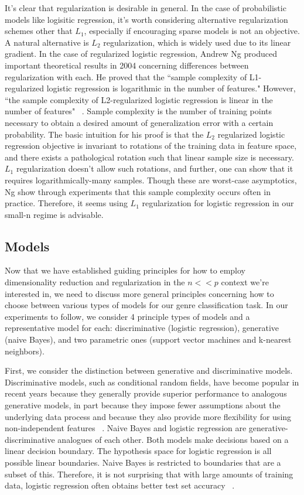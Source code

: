 \documentclass[]{article}
\begin{document}
	It's clear that regularization is desirable in general. In the case of probabilistic models like logisitic regression, it's worth considering alternative regularization schemes other that $L_1$, especially if encouraging sparse models is not an objective. A natural alternative is $L_2$ regularization, which is widely used due to its linear gradient. In the case of regularized logistic regression, Andrew Ng produced important theoretical results in 2004 concerning differences between regularization with each. He proved that the ``sample complexity of L1-regularized logistic regression is logarithmic in the number of features." However,  ``the sample complexity of L2-regularized logistic regression is linear in the number of features"  ~\cite{ng2004feature}. Sample complexity is the number of training points necessary to obtain a desired amount of generalization error with a certain probability. The basic intuition for his proof is that the $L_2$ regularized logistic regression objective is invariant to rotations of the training data in feature space, and there exists a pathological rotation such that linear sample size is necessary. $L_1$ regularization doesn't allow such rotations, and further, one can show that it requires logarithmically-many samples. Though these are worst-case asymptotics, Ng show through experiments that  this sample complexity occurs often in practice. Therefore, it seems using $L_1$ regularization for logistic regression in our small-n regime is advisable. 
\subsection{Models}
	Now that we have established guiding principles for how to employ dimensionality reduction and regularization in the $n << p$ context we're interested in, we need to discuss more general principles concerning how to choose between various types of models for our genre classification task. In our experiments to follow, we consider 4 principle types of models and a representative model for each: discriminative (logistic regression), generative (naive Bayes), and two parametric ones (support vector machines and k-nearest neighbors). 

	First, we consider the distinction between generative and discriminative models. Discriminative models, such as conditional random fields, have become popular in recent years because they generally provide superior performance to analogous generative models, in part because they impose fewer assumptions about the underlying data process and because they also provide more flexibility for using non-independent features ~\cite{lafferty2001conditional}. Naive Bayes and logistic regression are generative-discriminative analogues of each other. Both models make decisions based on a linear decision boundary. The hypothesis space for logistic regression is all possible linear boundaries. Naive Bayes is restricted to boundaries that are a subset of this. Therefore, it is not surprising that with large amounts of training data, logistic regression often obtains better test set accuracy ~\cite{jordan2002discriminative}. 	
	
\end{document}
